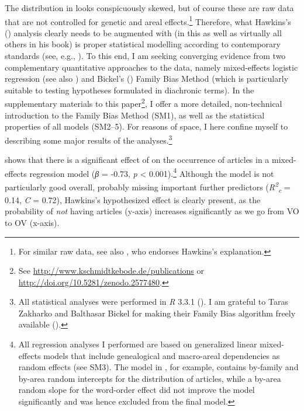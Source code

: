 \documentclass[output=paper]{langsci/langscibook}
\begin{document}
The distribution in  looks conspicuously skewed, but of course these are raw data that are not controlled for genetic and areal effects.\footnote{For similar raw data, see also \citet{Dryer2009_Corr}, who endorses Hawkins’s  explanation.} Therefore, what Hawkins's  (\citeyear{Hawkins2014_VarEff}) analysis clearly needs to be augmented with (in this  as well as virtually all others in his book) is proper statistical modelling according to contemporary standards (see, e.g., \citealt{Bickel2011_Modelling}). To this end, I am seeking converging evidence from two complementary quantitative approaches to the data, namely mixed-effects logistic regression (see also \citealt{Cysouw2010_NP,JaegerEtAl2011}) and Bickel’s (\citeyear{Bickel2011_Modelling,Bickel2013_Fam}) Family Bias Method (which is particularly suitable to testing hypotheses formulated in diachronic terms). In the supplementary materials to this paper\footnote{See \url{http://www.kschmidtkebode.de/publications} or \url{http://doi.org/10.5281/zenodo.2577480}.}, I offer a more detailed, non-technical introduction to the Family Bias Method (SM1), as well as the statistical properties of all models (SM2–5). For reasons of space, I here confine myself to describing some major results of the analyses.\footnote{All statistical analyses were performed in \textit{R} 3.3.1 (\citealt{RTeam2016_R}). I am grateful to Taras Zakharko and Balthasar Bickel for making their Family Bias algorithm freely available (\citealt{ZakharkoBickel2011}).}

 shows that there is a significant effect of  on the occurrence of articles in a mixed-effects regression model (\textit{β} = -0.73, \textit{p} < 0.001).\footnote{All regression analyses I performed are based on generalized linear mixed-effects models that include genealogical and macro-areal dependencies as random effects (see SM3). The model in , for example, contains by-family and by-area random intercepts for the distribution of articles, while a by-area random slope for the word-order effect did not improve the model significantly and was hence excluded from the final model.} Although the model is not particularly good overall, probably missing important further predictors (\textit{R\textsuperscript{2}}\textit{\textsubscript{c}} = 0.14, \textit{C} = 0.72), Hawkins’s hypothesized effect is clearly present, as the probability of \textit{not} having articles (y-axis) increases significantly as we go from VO to OV (x-axis).
\end{document}

